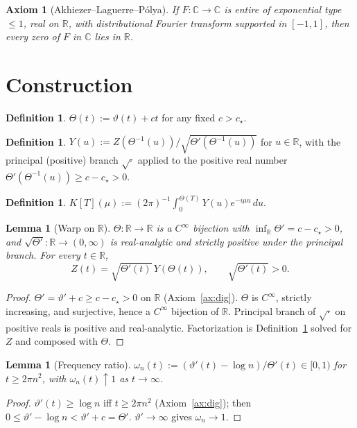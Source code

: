 \documentclass[11pt,a4paper]{article}
\theoremstyle{plain}
\newtheorem{axiom}{Axiom}
\newtheorem{lemma}[theorem]{Lemma}
\theoremstyle{definition}
\newtheorem{definition}[theorem]{Definition}
\newcommand{\R}{\mathbb{R}}
\newcommand{\C}{\mathbb{C}}
\begin{document}
\begin{axiom}[Akhiezer--Laguerre--P\'olya]\label{ax:AK}
If $F:\C\to\C$ is entire of exponential type $\le 1$, real on $\R$, with distributional Fourier transform supported in $[-1,1]$, then every zero of $F$ in $\C$ lies in $\R$.
\end{axiom}

\section{Construction}

\begin{definition}\label{def:Theta}
$\Theta(t):=\vartheta(t)+ct$ for any fixed $c>c_\star$.
\end{definition}

\begin{definition}\label{def:Y}
$Y(u):=Z(\Theta^{-1}(u))/\sqrt{\Theta'(\Theta^{-1}(u))}$ for $u\in\R$, with the principal (positive) branch $\sqrt{\cdot}$ applied to the positive real number $\Theta'(\Theta^{-1}(u))\ge c-c_\star>0$.
\end{definition}

\begin{definition}\label{def:K}
$K[T](\mu):=(2\pi)^{-1}\int_0^{\Theta(T)}Y(u)e^{-i\mu u}\,du$.
\end{definition}

\begin{lemma}[Warp on $\R$]\label{lem:warp}
$\Theta:\R\to\R$ is a $C^\infty$ bijection with $\inf_\R\Theta'=c-c_\star>0$, and $\sqrt{\Theta'}:\R\to(0,\infty)$ is real-analytic and strictly positive under the principal branch. For every $t\in\R$,
\[
Z(t)=\sqrt{\Theta'(t)}\,Y(\Theta(t)),\qquad \sqrt{\Theta'(t)}>0.
\]
\end{lemma}
\begin{proof}
$\Theta'=\vartheta'+c\ge c-c_\star>0$ on $\R$ (Axiom~\ref{ax:dig}). $\Theta$ is $C^\infty$, strictly increasing, and surjective, hence a $C^\infty$ bijection of $\R$. Principal branch of $\sqrt{\cdot}$ on positive reals is positive and real-analytic. Factorization is Definition~\ref{def:Y} solved for $Z$ and composed with $\Theta$.
\end{proof}

\begin{lemma}[Frequency ratio]\label{lem:freq}
$\omega_n(t):=(\vartheta'(t)-\log n)/\Theta'(t)\in[0,1)$ for $t\ge 2\pi n^2$, with $\omega_n(t)\uparrow 1$ as $t\to\infty$.
\end{lemma}
\begin{proof}
$\vartheta'(t)\ge\log n$ iff $t\ge 2\pi n^2$ (Axiom~\ref{ax:dig}); then $0\le\vartheta'-\log n<\vartheta'+c=\Theta'$. $\vartheta'\to\infty$ gives $\omega_n\to 1$.
\end{proof}
\end{document}
